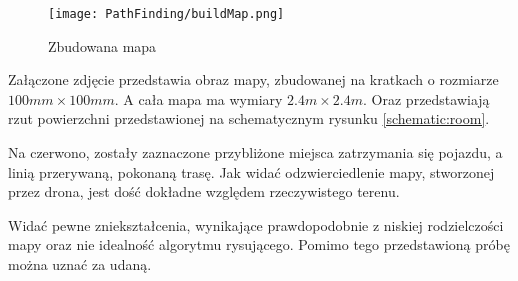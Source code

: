             \begin{figure}[!ht]
                \centering
                \texttt{[image: PathFinding/buildMap.png]}
                \caption{Zbudowana mapa}
                \label{fig:buildMap}
            \end{figure}

            Załączone zdjęcie przedstawia obraz mapy, zbudowanej na kratkach o rozmiarze $100mm \times 100mm$.
            A cała mapa ma wymiary $ 2.4m \times 2.4m$.
            Oraz przedstawiają rzut powierzchni przedstawionej na schematycznym rysunku \ref{schematic:room}.

            

            Na czerwono, zostały zaznaczone przybliżone miejsca zatrzymania się pojazdu, a linią przerywaną, pokonaną trasę.
            Jak widać odzwierciedlenie mapy, stworzonej przez drona, jest dość dokładne względem rzeczywistego terenu.

            Widać pewne zniekształcenia, wynikające prawdopodobnie z niskiej rodzielczości mapy oraz nie idealność algorytmu rysującego.
            Pomimo tego przedstawioną próbę można uznać za udaną.